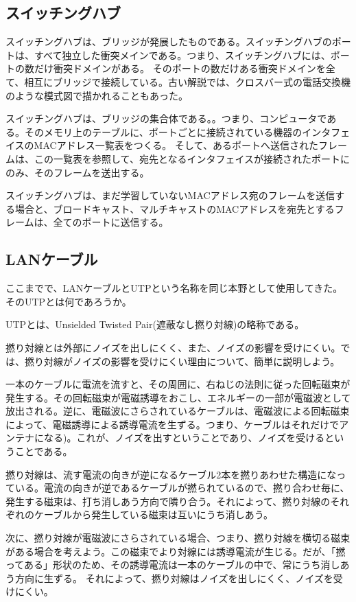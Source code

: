 \subsection{スイッチングハブ}

スイッチングハブは、ブリッジが発展したものである。スイッチングハブのポートは、すべて独立した衝突メインである。つまり、スイッチングハブには、ポートの数だけ衝突ドメインがある。
そのポートの数だけある衝突ドメインを全て、相互にブリッジで接続している。古い解説では、クロスバー式の電話交換機のような模式図で描かれることもあった。

スイッチングハブは、ブリッジの集合体である。。つまり、コンピュータである。そのメモリ上のテーブルに、ポートごとに接続されている機器のインタフェイスのMACアドレス一覧表をつくる。
そして、あるポートへ送信されたフレームは、この一覧表を参照して、宛先となるインタフェイスが接続されたポートにのみ、そのフレームを送出する。

スイッチングハブは、まだ学習していないMACアドレス宛のフレームを送信する場合と、ブロードキャスト、マルチキャストのMACアドレスを宛先とするフレームは、全てのポートに送信する。

\subsection{LANケーブル}

ここまでで、LANケーブルとUTPという名称を同じ本野として使用してきた。そのUTPとは何であろうか。

UTPとは、Unsielded Twisted Pair(遮蔽なし撚り対線)の略称である。

撚り対線とは外部にノイズを出しにくく、また、ノイズの影響を受けにくい。では、撚り対線がノイズの影響を受けにくい理由について、簡単に説明しよう。

一本のケーブルに電流を流すと、その周囲に、右ねじの法則に従った回転磁束が発生する。その回転磁束が電磁誘導をおこし、エネルギーの一部が電磁波として放出される。逆に、電磁波にさらされているケーブルは、電磁波による回転磁束によって、電磁誘導による誘導電流を生ずる。つまり、ケーブルはそれだけでアンテナになる)。これが、ノイズを出すということであり、ノイズを受けるということである。

撚り対線は、流す電流の向きが逆になるケーブル2本を撚りあわせた構造になっている。電流の向きが逆であるケーブルが撚られているので、撚り合わせ毎に、発生する磁束は、打ち消しあう方向で隣り合う。それによって、撚り対線のそれぞれのケーブルから発生している磁束は互いにうち消しあう。

次に、撚り対線が電磁波にさらされている場合、つまり、撚り対線を横切る磁束がある場合を考えよう。この磁束でより対線には誘導電流が生じる。だが、「撚ってある」形状のため、その誘導電流は一本のケーブルの中で、常にうち消しあう方向に生ずる。
それによって、撚り対線はノイズを出しにくく、ノイズを受けにくい。

